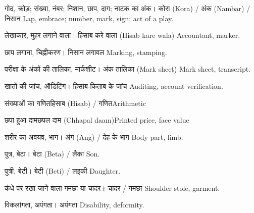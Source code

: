 
%
{गोद, क्रोड़; संख्या, नंबर; निशान, छाप, दाग; नाटक का अंक।}%
{कोरा (Kora) / अंक (Nambar) / निसान}%
{Lap, embrace; number, mark, sign; act of a play.}

%
{लेखाकार, मुहर लगाने वाला।}%
{हिसाब करे वाला (Hisab kare wala)}%
{Accountant, marker.}

%
{छाप लगाना, चिह्नीकरण।}%
{निसान लगावल}%
{Marking, stamping.}

%
{परीक्षा के अंकों की तालिका, मार्कशीट।}%
{अंक तालिका (Mark sheet)}%
{Mark sheet, transcript.}

%
{खातों की जांच, ऑडिटिंग।}%
{हिसाब-किताब के जांच}%
{Auditing, account verification.}

%
{संख्याओं का गणित}{हिसाब (Hisab) / गणित}{Arithmetic}

%
{छपा हुआ दाम}{छपल दाम (Chhapal daam)}{Printed price, face value}

%
{शरीर का अवयव, भाग।}%
{अंग (Ang) / देह के भाग}%
{Body part, limb.}

%
{पुत्र, बेटा।}%
{बेटा (Beta) / लैका}%
{Son.}

%
{पुत्री, बेटी।}%
{बेटी (Beti) / लइकी}%
{Daughter.}

%
{कंधे पर रखा जाने वाला गमछा या चादर।}%
{चादर / गमछा}%
{Shoulder stole, garment.}

%
{विकलांगता, अपंगता।}%
{अपंगता}%
{Disability, deformity.}


